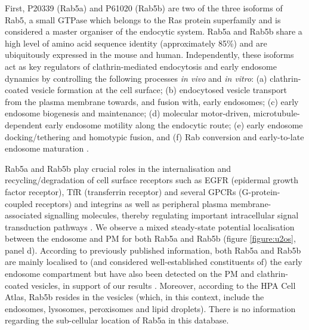 \documentclass[12pt,english]{article}
\begin{document}
First, P20339 (Rab5a) and P61020 (Rab5b) are two of the three isoforms of Rab5, a small GTPase which belongs to the Ras protein superfamily and is considered a master organiser of the endocytic system. Rab5a and Rab5b share a high level of amino acid sequence identity (approximately 85\%) and are ubiquitously expressed in the mouse and human. Independently, these isoforms act as key regulators of clathrin-mediated endocytosis and early endosome dynamics by controlling the following processes \textit{in vivo} and \textit{in vitro}: (a) clathrin-coated vesicle formation at the cell surface; (b) endocytosed vesicle transport from the plasma membrane towards, and fusion with, early endosomes; (c) early endosome biogenesis and maintenance; (d) molecular motor-driven, microtubule-dependent early endosome motility along the endocytic route; (e) early endosome docking/tethering and homotypic fusion, and (f) Rab conversion and early-to-late endosome maturation
\citep{Simonsen::1998, Zerial::2001, Rink::2005, Chen::2014, Gautreau::2014, Law::2017}.

Rab5a and Rab5b play crucial roles in the internalisation and recycling/degradation of cell surface receptors such as EGFR (epidermal growth factor receptor), TfR (transferrin receptor) and several GPCRs (G-protein-coupled receptors) and integrins as well as peripheral plasma membrane-associated signalling molecules, thereby regulating important intracellular signal transduction pathways \citep{Trischler::1999, Chen::2009, Bastin::2013, Liu::2015}. We observe a mixed steady-state potential localisation between the endosome and PM for both Rab5a and Rab5b (figure \ref{figure:u2os}, panel d). According to previously published information, both Rab5a and Rab5b are mainly localised to (and considered well-established constituents of) the early endosome compartment but have also been detected on the PM and clathrin-coated vesicles, in support of our results \citep{Simonsen::1998, Woodman::2000, Mendoza::2013}. Moreover, according to the HPA Cell Atlas, Rab5b resides in the vesicles (which, in this context, include the endosomes, lysosomes, peroxisomes and lipid droplets). There is no information regarding the sub-cellular location of Rab5a in this database.  
\end{document}
